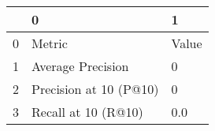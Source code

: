 \begin{tabular}{lll}
\toprule
{} &                       0 &      1 \\
\midrule
0 &                  Metric &  Value \\
1 &       Average Precision &      0 \\
2 &  Precision at 10 (P@10) &      0 \\
3 &     Recall at 10 (R@10) &    0.0 \\
\bottomrule
\end{tabular}
